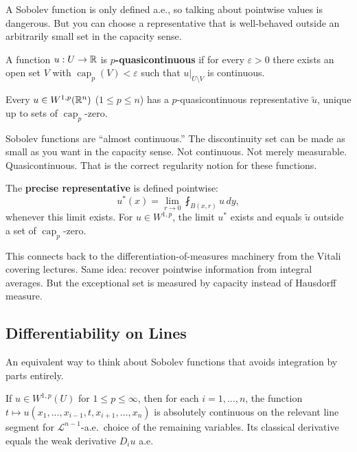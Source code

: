 A Sobolev function is only defined a.e., so talking about pointwise values is dangerous. But you can choose a representative that is well-behaved outside an arbitrarily small set in the capacity sense.

\begin{definition}[Quasicontinuous]
\label{def:quasicontinuous}
A function $u : U \to \mathbb{R}$ is \textbf{$p$-quasicontinuous} if for every $\varepsilon > 0$ there exists an open set $V$ with $\operatorname{cap}_p(V) < \varepsilon$ such that $u|_{U \setminus V}$ is continuous.
\end{definition}

\begin{theorem}
\label{thm:quasi-rep}
Every $u \in W^{1,p}(\mathbb{R}^n)$ ($1 \leq p \leq n$) has a $p$-quasicontinuous representative $\tilde{u}$, unique up to sets of $\operatorname{cap}_p$-zero.
\end{theorem}

Sobolev functions are ``almost continuous.'' The discontinuity set can be made as small as you want in the capacity sense. Not continuous. Not merely measurable. Quasicontinuous. That is the correct regularity notion for these functions.

The \textbf{precise representative} is defined pointwise:
\[
    u^*(x) = \lim_{r \to 0} \fint_{B(x,r)} u \, dy,
\]
whenever this limit exists. For $u \in W^{1,p}$, the limit $u^*$ exists and equals $\tilde{u}$ outside a set of $\operatorname{cap}_p$-zero.

This connects back to the differentiation-of-measures machinery from the Vitali covering lectures. Same idea: recover pointwise information from integral averages. But the exceptional set is measured by capacity instead of Hausdorff measure.


\subsection{Differentiability on Lines}

An equivalent way to think about Sobolev functions that avoids integration by parts entirely.

\begin{theorem}
\label{thm:diff-lines}
If $u \in W^{1,p}(U)$ for $1 \leq p \leq \infty$, then for each $i = 1, \ldots, n$, the function $t \mapsto u(x_1, \ldots, x_{i-1}, t, x_{i+1}, \ldots, x_n)$ is absolutely continuous on the relevant line segment for $\mathcal{L}^{n-1}$-a.e.\ choice of the remaining variables. Its classical derivative equals the weak derivative $D_i u$ a.e.
\end{theorem}


